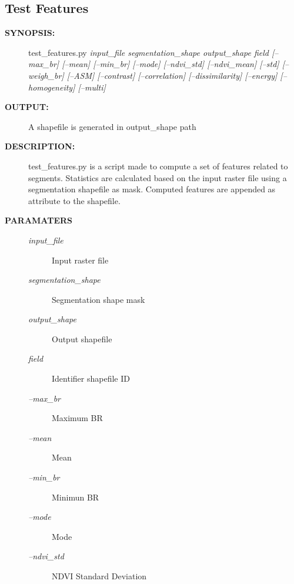 \documentclass[letterpaper,10pt,english]{sphinxmanual}
\begin{document}
\subsection{Test Features}
\label{user:test-features}\begin{description}
\item[{\textbf{SYNOPSIS:}}] \leavevmode
test\_features.py \emph{input\_file segmentation\_shape output\_shape field {[}--max\_br{]} {[}--mean{]} {[}--min\_br{]} {[}--mode{]} {[}--ndvi\_std{]} {[}--ndvi\_mean{]} {[}--std{]} {[}--weigh\_br{]} {[}--ASM{]} {[}--contrast{]} {[}--correlation{]} {[}--dissimilarity{]} {[}--energy{]} {[}--homogeneity{]} {[}--multi{]}}

\item[{\textbf{OUTPUT:}}] \leavevmode
A shapefile is generated in output\_shape path

\item[{\textbf{DESCRIPTION:}}] \leavevmode
test\_features.py is a script made to compute a set of features related to segments. Statistics are calculated based on the input raster file using a segmentation shapefile as mask. Computed features are appended as attribute to the shapefile.

\item[{\textbf{PARAMATERS}}] \leavevmode\begin{description}
\item[{\emph{input\_file}}] \leavevmode
Input raster file

\item[{\emph{segmentation\_shape}}] \leavevmode
Segmentation shape mask

\item[{\emph{output\_shape}}] \leavevmode
Output shapefile

\item[{\emph{field}}] \leavevmode
Identifier shapefile ID

\item[{\emph{--max\_br}}] \leavevmode
Maximum BR

\item[{\emph{--mean}}] \leavevmode
Mean

\item[{\emph{--min\_br}}] \leavevmode
Minimun BR

\item[{\emph{--mode}}] \leavevmode
Mode

\item[{\emph{--ndvi\_std}}] \leavevmode
NDVI Standard Deviation


\end{description}
\end{description}
\end{document}
